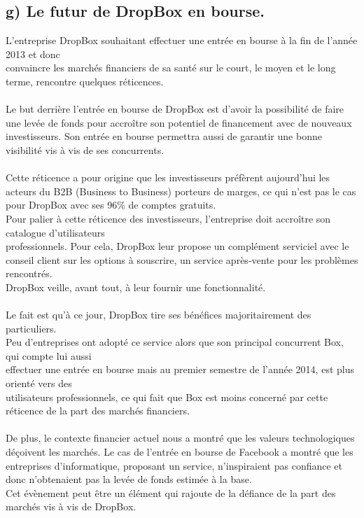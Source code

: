 \documentclass[a4paper, 10pt]{article}
\begin{document}
\subsection*{g) Le futur de DropBox en bourse.}
\indent

L'entreprise DropBox souhaitant effectuer une entrée en bourse à la fin de l'année 2013 et
donc\\convaincre les marchés financiers de sa santé sur le court, le moyen et le long terme, rencontre quelques réticences.\\ \\
Le but derrière l'entrée en bourse de DropBox est d'avoir la possibilité de faire une levée de fonds
pour accroître son potentiel de financement avec de nouveaux investisseurs.
Son entrée en bourse permettra aussi de garantir une bonne visibilité vis à vis de ses concurrents.\\ \\
Cette réticence a pour origine que les investisseurs préfèrent aujourd'hui les acteurs du B2B (Business to Business) porteurs de marges,
ce qui n'est pas le cas pour DropBox avec ses 96\% de comptes gratuits.\\
Pour palier à cette réticence des investisseurs, l'entreprise doit accroître son catalogue d'utilisateurs\\professionnels.
Pour cela, DropBox leur propose un complément serviciel avec le conseil client sur les options à souscrire,
un service après-vente pour les problèmes rencontrés.\\
DropBox veille, avant tout, à leur fournir une fonctionnalité.\\ \\
Le fait est qu'à ce jour, DropBox tire ses bénéfices majoritairement des particuliers.\\
Peu d'entreprises ont adopté ce service alors que son principal concurrent Box,
qui compte lui aussi\\effectuer une entrée en bourse mais au premier semestre de l'année 2014,
est plus orienté vers des\\utilisateurs professionnels,
ce qui fait que Box est moins concerné par cette réticence de la part des marchés financiers.\\ \\
De plus, le contexte financier actuel nous a montré que les valeurs technologiques déçoivent les marchés.
Le cas de l'entrée en bourse de Facebook a montré que les entreprises d'informatique, proposant un service,
n'inspiraient pas confiance et donc n'obtenaient pas la levée de fonds estimée à la base.\\
Cet évènement peut être un élément qui rajoute de la défiance de la part des marchés vis à vis de DropBox.\\ \\
\end{document}
